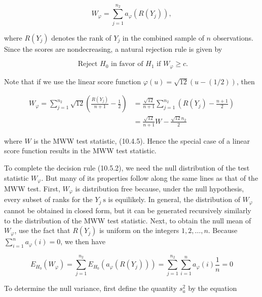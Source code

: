 \begin{equation*}
W_{\varphi}=\sum_{j=1}^{n_{2}} a_{\varphi}\left(R\left(Y_{j}\right)\right), \tag{10.5.2}
\end{equation*}


where $R\left(Y_{j}\right)$ denotes the rank of $Y_{j}$ in the combined sample of $n$ observations. Since the scores are nondecreasing, a natural rejection rule is given by


\begin{equation*}
\text { Reject } H_{0} \text { in favor of } H_{1} \text { if } W_{\varphi} \geq c . \tag{10.5.3}
\end{equation*}


Note that if we use the linear score function $\varphi(u)=\sqrt{12}(u-(1 / 2))$, then


\begin{align*}
W_{\varphi}=\sum_{j=1}^{n_{2}} \sqrt{12}\left(\frac{R\left(Y_{j}\right)}{n+1}-\frac{1}{2}\right) & =\frac{\sqrt{12}}{n+1} \sum_{j=1}^{n_{2}}\left(R\left(Y_{j}\right)-\frac{n+1}{2}\right) \\
& =\frac{\sqrt{12}}{n+1} W-\frac{\sqrt{12} n_{2}}{2} \tag{10.5.4}
\end{align*}


where $W$ is the MWW test statistic, (10.4.5). Hence the special case of a linear score function results in the MWW test statistic.

To complete the decision rule (10.5.2), we need the null distribution of the test statistic $W_{\varphi}$. But many of its properties follow along the same lines as that of the MWW test. First, $W_{\varphi}$ is distribution free because, under the null hypothesis, every subset of ranks for the $Y_{j} \mathrm{~s}$ is equilikely. In general, the distribution of $W_{\varphi}$ cannot be obtained in closed form, but it can be generated recursively similarly to the distribution of the MWW test statistic. Next, to obtain the null mean of $W_{\varphi}$, use the fact that $R\left(Y_{j}\right)$ is uniform on the integers $1,2, \ldots, n$. Because $\sum_{i=1}^{n} a_{\varphi}(i)=0$, we then have


\begin{equation*}
E_{H_{0}}\left(W_{\varphi}\right)=\sum_{j=1}^{n_{2}} E_{H_{0}}\left(a_{\varphi}\left(R\left(Y_{j}\right)\right)\right)=\sum_{j=1}^{n_{2}} \sum_{i=1}^{n} a_{\varphi}(i) \frac{1}{n}=0 \tag{10.5.5}
\end{equation*}


To determine the null variance, first define the quantity $s_{a}^{2}$ by the equation


